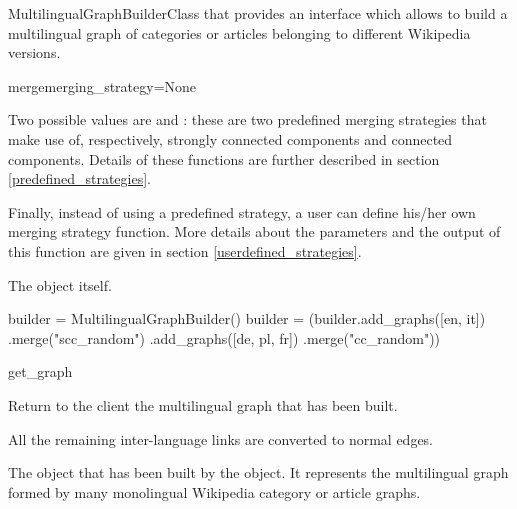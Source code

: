 \begin{classdoc}{MultilingualGraphBuilder}{Class that provides an interface which allows to build a multilingual graph of categories or articles belonging to different Wikipedia versions.}
\begin{classmethod}{merge}{merging\_strategy=None}
\begin{functionparameters}
                        Two possible values are  and : these are two predefined merging strategies that make use of, respectively, strongly connected components and connected components. Details of these functions are further described in section \ref{predefined_strategies}.
                        
                        Finally, instead of using a predefined strategy, a user can define his/her own merging strategy function. More details about the parameters and the output of this function are given in section \ref{userdefined_strategies}.
                    \end{functionparameters}
                    
                    \begin{functionoutput}
                        The  object itself.
                    \end{functionoutput}
                    
                    \begin{functionexample}
builder = MultilingualGraphBuilder()
builder = (builder.add_graphs([en, it])
                  .merge("scc_random")
                  .add_graphs([de, pl, fr])
                  .merge("cc_random"))
                    \end{functionexample}
                \end{classmethod}
                \item \begin{classmethod}{get\_graph}{}
                
                    \begin{functiondescription}
                        Return to the client the multilingual graph that has been built.
                        
                        All the remaining inter-language links are converted to normal edges.
                    \end{functiondescription}
                    
                    \emptyfunctionparameters{}
                    
                    \begin{functionoutput}
                        The  object that has been built by the  object. It represents the multilingual graph formed by many monolingual Wikipedia category or article graphs.
                    \end{functionoutput}
                    

\end{classmethod}
\end{classdoc}
